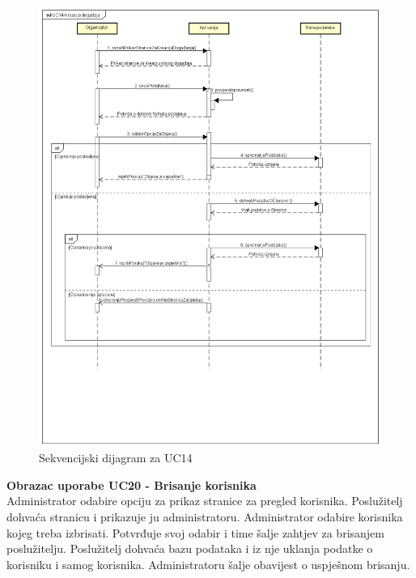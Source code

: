 				\begin{figure}[H]
						\includegraphics[width=\textwidth]{slike/uc14-1.PNG}
						\caption{Sekvencijski dijagram za UC14}
						\label{fig:uc14}
				\end{figure}
				
				\eject
				
				
				\textbf{\large Obrazac uporabe UC20 - Brisanje korisnika}\\
				
				Administrator odabire opciju za prikaz stranice za pregled korisnika. Poslužitelj dohvaća stranicu i prikazuje ju administratoru. Administrator odabire korisnika kojeg treba izbrisati. Potvrđuje svoj odabir i time šalje zahtjev za brisanjem poslužitelju. Poslužitelj dohvaća bazu podataka i iz nje uklanja podatke o korisniku i samog korisnika. Administratoru šalje obavijest o uspješnom brisanju.
				
